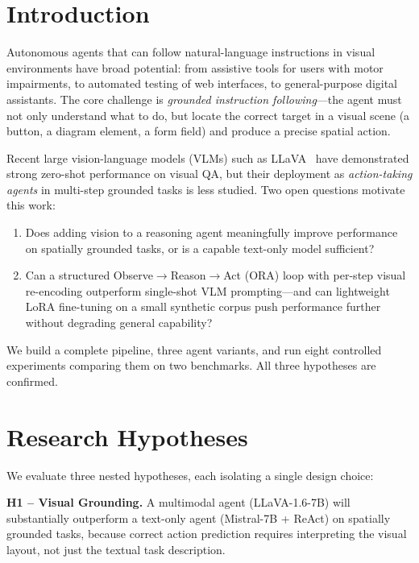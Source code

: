 \documentclass[10pt,twocolumn]{article}
\begin{document}
\section{Introduction}

Autonomous agents that can follow natural-language instructions in visual environments have broad
potential: from assistive tools for users with motor impairments, to automated testing of
web interfaces, to general-purpose digital assistants. The core challenge is
\emph{grounded instruction following}---the agent must not only understand what to do, but
locate the correct target in a visual scene (a button, a diagram element, a form field) and
produce a precise spatial action.

Recent large vision-language models (VLMs) such as LLaVA~\cite{liu2024llava} have demonstrated
strong zero-shot performance on visual QA, but their deployment as \emph{action-taking agents}
in multi-step grounded tasks is less studied. Two open questions motivate this work:

\begin{enumerate}
  \item Does adding vision to a reasoning agent meaningfully improve performance on spatially
        grounded tasks, or is a capable text-only model sufficient?
  \item Can a structured Observe$\to$Reason$\to$Act (ORA) loop with per-step visual re-encoding
        outperform single-shot VLM prompting---and can lightweight LoRA fine-tuning on a small
        synthetic corpus push performance further without degrading general capability?
\end{enumerate}

We build a complete pipeline, three agent variants, and run eight controlled experiments
comparing them on two benchmarks. All three hypotheses are confirmed.

\section{Research Hypotheses}

We evaluate three nested hypotheses, each isolating a single design choice:

\textbf{H1 -- Visual Grounding.}
A multimodal agent (LLaVA-1.6-7B) will substantially outperform a text-only agent
(Mistral-7B + ReAct) on spatially grounded tasks, because correct action prediction requires
interpreting the visual layout, not just the textual task description.
\end{document}
